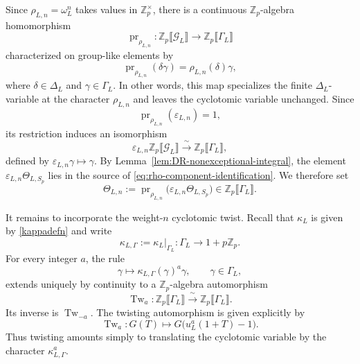 \documentclass[11pt,table]{amsart}
\numberwithin{equation}{section}
\begin{document}
Since \(\rho_{L,n}=\omega_L^n\) takes values in
\(\mathbb Z_p^\times\), there is a continuous
\(\mathbb Z_p\)-algebra homomorphism
\begin{equation}
\label{eq:rho-specialization-map}
        \operatorname{pr}_{\rho_{L,n}}:
        \mathbb Z_p\llbracket\mathcal G_L\rrbracket
        \longrightarrow
        \mathbb Z_p\llbracket\Gamma_L\rrbracket
\end{equation}
characterized on group-like elements by
\[
        \operatorname{pr}_{\rho_{L,n}}(\delta\gamma)
        =
        \rho_{L,n}(\delta)\gamma,
\]
where $\delta\in\Delta_L$ and $\gamma\in\Gamma_L$.
In other words, this map specializes the finite
\(\Delta_L\)-variable at the character \(\rho_{L,n}\) and leaves the
cyclotomic variable unchanged.  Since
\[
        \operatorname{pr}_{\rho_{L,n}}(\varepsilon_{L,n})=1,
\]
its restriction induces an isomorphism
\begin{equation}
\label{eq:rho-component-identification}
        \varepsilon_{L,n}
        \mathbb Z_p\llbracket\mathcal G_L\rrbracket
        \xrightarrow{\;\sim\;}
        \mathbb Z_p\llbracket\Gamma_L\rrbracket,
\end{equation}
defined by $\varepsilon_{L,n}\gamma\longmapsto\gamma$. By Lemma~\ref{lem:DR-nonexceptional-integral}, the element
\(\varepsilon_{L,n}\Theta_{L,S_p}\) lies in the source of
\eqref{eq:rho-component-identification}.  We therefore set
\[
        \Theta_{L,n}
        :=
        \operatorname{pr}_{\rho_{L,n}}
        \bigl(\varepsilon_{L,n}\Theta_{L,S_p}\bigr)
        \in
        \mathbb Z_p\llbracket\Gamma_L\rrbracket.
\]

It remains to incorporate the weight-\(n\) cyclotomic twist. Recall that $\kappa_L$ is given by \eqref{kappadefn} and write
\[
        \kappa_{L,\Gamma}
        :=
        \kappa_L|_{\Gamma_L}:
        \Gamma_L\longrightarrow1+p\mathbb Z_p.
\]
For every integer \(a\), the rule
\[
        \gamma\longmapsto
        \kappa_{L,\Gamma}(\gamma)^a\gamma,
        \qquad
        \gamma\in\Gamma_L,
\]
extends uniquely by continuity to a
\(\mathbb Z_p\)-algebra automorphism
\begin{equation}
\label{eq:cyclotomic-twist-map}
        \operatorname{Tw}_a:
        \mathbb Z_p\llbracket\Gamma_L\rrbracket
        \xrightarrow{\;\sim\;}
        \mathbb Z_p\llbracket\Gamma_L\rrbracket.
\end{equation}
Its inverse is \(\operatorname{Tw}_{-a}\). The twisting automorphism is given explicitly by
\[
        \operatorname{Tw}_a:
        G(T)
        \longmapsto
        G\bigl(u_L^a(1+T)-1\bigr).
\]
Thus twisting amounts simply to translating the cyclotomic variable by
the character \(\kappa_{L,\Gamma}^a\).
\end{document}
